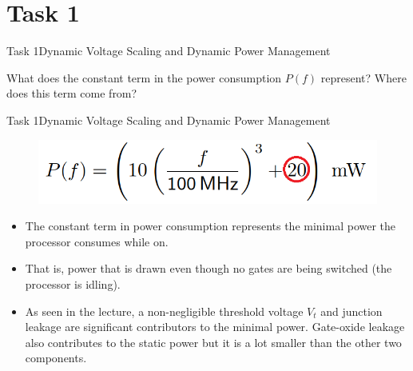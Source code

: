 
\section{Task 1}

\setcounter{task}{1}
\begin{frame}{Task 1}{Dynamic Voltage Scaling and Dynamic Power Management}
    \begin{tasknoinc}
        What does the constant term in the power consumption $P(f)$ represent? Where does this term come from?
    \end{tasknoinc}
\end{frame}
\begin{frame}{Task 1}{Dynamic Voltage Scaling and Dynamic Power Management}
    \begin{solutionnoinc}
        \begin{figure}
            \centering
            \includegraphics[scale=0.3]{figures/constantTerm.PNG}
        \end{figure}
    \begin{itemize}
        \item The constant term in power consumption represents the minimal power the processor consumes while on.
        \item That is, power that is drawn even though no gates are being switched (the processor is idling).
        \item As seen in the lecture, a non-negligible threshold voltage $V_t$ and junction leakage are significant contributors to the minimal power. Gate-oxide leakage also contributes to the static power but it is a lot smaller than the other two components.
    \end{itemize}
    \end{solutionnoinc}
\end{frame}
